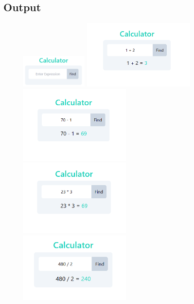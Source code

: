 \documentclass{article}
\begin{document}
\subsection{Output}
\begin{figure}[h!]
	\centering
	\includegraphics[width=0.3\textwidth]{./Assets/p1301.png}
	\includegraphics[width=0.5\textwidth]{./Assets/p1302.png}
	\includegraphics[width=0.5\textwidth]{./Assets/p1303.png}
	\includegraphics[width=0.5\textwidth]{./Assets/p1304.png}
	\includegraphics[width=0.5\textwidth]{./Assets/p1305.png}
\end{figure}
\newpage
\end{document}
